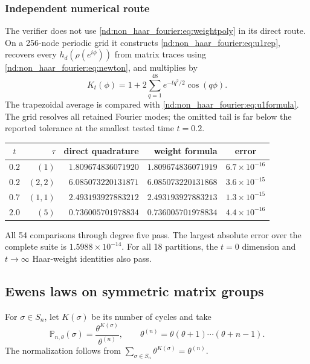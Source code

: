 \documentclass[10pt]{article}
\begin{document}
\subsubsection{Independent numerical route}
The verifier does not use \eqref{nd:non_haar_fourier:eq:weightpoly} in its direct route.  On a
256-node periodic grid it constructs \eqref{nd:non_haar_fourier:eq:u1rep}, recovers every
$h_d(\rho(e^{i\phi}))$ from matrix traces using \eqref{nd:non_haar_fourier:eq:newton}, and
multiplies by
\begin{equation}\label{nd:non_haar_fourier:eq:heatkernel}
 K_t(\phi)=1+2\sum_{q=1}^{48}e^{-tq^2/2}\cos(q\phi).
\end{equation}
The trapezoidal average is compared with \eqref{nd:non_haar_fourier:eq:u1formula}.  The grid
resolves all retained Fourier modes; the omitted tail is far below the
reported tolerance at the smallest tested time $t=0.2$.

\begin{center}
\begin{tabular}{@{}crrrc@{}}
\toprule
$t$ & $\tau$ & direct quadrature & weight formula & error\\
\midrule
$0.2$ & $(1)$ & $1.809674836071920$ & $1.809674836071919$ & $6.7\times10^{-16}$\\
$0.2$ & $(2,2)$ & $6.085073220131871$ & $6.085073220131868$ & $3.6\times10^{-15}$\\
$0.7$ & $(1,1)$ & $2.493193927883212$ & $2.493193927883213$ & $1.3\times10^{-15}$\\
$2.0$ & $(5)$ & $0.736005701978834$ & $0.736005701978834$ & $4.4\times10^{-16}$\\
\bottomrule
\end{tabular}
\end{center}
All 54 comparisons through degree five pass.  The largest absolute error over
the complete suite is $1.5988\times10^{-14}$.  For all 18 partitions, the
$t=0$ dimension and $t\to\infty$ Haar-weight identities also pass.

\subsection{Ewens laws on symmetric matrix groups}

For $\sigma\in S_n$, let $K(\sigma)$ be its number of cycles and take
\begin{equation}\label{nd:non_haar_fourier:eq:ewenslaw}
 \mathbb P_{n,\theta}(\sigma)
 =\frac{\theta^{K(\sigma)}}{\theta^{(n)}},\qquad
 \theta^{(n)}=\theta(\theta+1)\cdots(\theta+n-1).
\end{equation}
The normalization follows from
$\sum_{\sigma\in S_n}\theta^{K(\sigma)}=\theta^{(n)}$.
\end{document}
